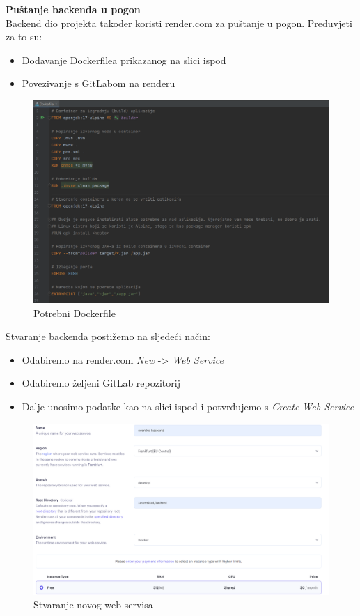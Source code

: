 			\noindent \textbf{Puštanje backenda u pogon}\\
			
			\indent Backend dio projekta također koristi render.com za puštanje u pogon. Preduvjeti za to su:		\begin{itemize}
				\item Dodavanje Dockerfilea prikazanog na slici ispod
				\item Povezivanje s GitLabom na renderu
			\end{itemize}
			\begin{figure}[H]
				\includegraphics[width=\textwidth]{Opis deploymenta/Slika5.png}
				\caption{Potrebni Dockerfile}
			\end{figure}
		
			\indent Stvaranje backenda postižemo na sljedeći način:
			\begin{itemize}
				\item Odabiremo na render.com \textit{New} -> \textit{Web Service}
				\item Odabiremo željeni GitLab repozitorij
				\item Dalje unosimo podatke kao na slici ispod i potvrđujemo s \textit{Create Web Service}
			\end{itemize}
			\begin{figure}[H]
				\includegraphics[width=\textwidth]{Opis deploymenta/Slika6.png}
				\caption{Stvaranje novog web servisa}
			\end{figure}
		
